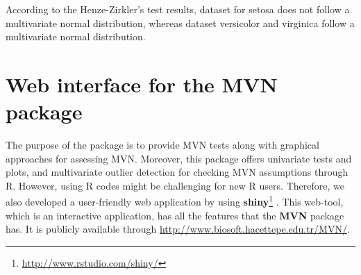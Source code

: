 \documentclass[11pt]{article}
\begin{document}
\begin{Schunk}
\end{Schunk}

According to the Henze-Zirkler's test results, dataset for setosa does not follow a multivariate normal distribution, whereas dataset versicolor and virginica follow a multivariate normal distribution.

\section{Web interface for the MVN package} \label{sec:webInterface}

The purpose of the package is to provide MVN tests along with graphical approaches for assessing MVN. Moreover, this package offers univariate tests and plots, and multivariate outlier detection for checking MVN assumptions through R. However, using R codes might be challenging for new R users. Therefore, we also developed a user-friendly web application by using \textbf{shiny}\footnote{\url{http://www.rstudio.com/shiny/}} \cite{shiny:2014}. This web-tool, which is an interactive application, has all the features that the \textbf{MVN} package has. It is publicly available through \url{http://www.biosoft.hacettepe.edu.tr/MVN/}.





\end{document}
